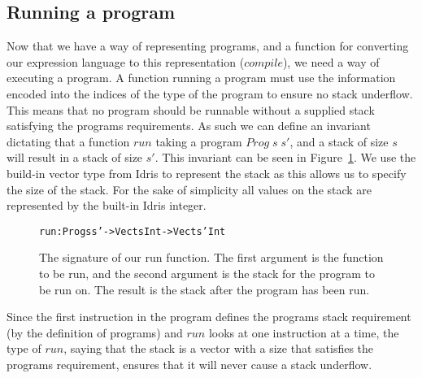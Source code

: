 \subsection{Running a program}
\label{sec:running_a_program}
Now that we have a way of representing programs, and a function for converting our expression language to this representation ($compile$), we need a way of executing a program. A function running a program must use the information encoded into the indices of the type of the program to ensure no stack underflow. This means that no program should be runnable without a supplied stack satisfying the programs requirements. As such we can define an invariant dictating that a function $run$ taking a program $Prog\;s\;s'$, and a stack of size $s$ will result in a stack of size $s'$. This invariant can be seen in Figure~\ref{fig:run_function}. We use the build-in vector type from Idris to represent the stack as this allows us to specify the size of the stack. For the sake of simplicity all values on the stack are represented by the built-in Idris integer. 

\begin{figure}
\begin{alltt}
run : Prog s s' -> Vect s Int -> Vect s' Int
\end{alltt}
\caption{The signature of our run function. The first argument is the function to be run, and the second argument is the stack for the program to be run on. The result is the stack after the program has been run.}
\label{fig:run_function}
\end{figure}

Since the first instruction in the program defines the programs stack requirement (by the definition of programs) and $run$ looks at one instruction at a time, the type of $run$, saying that the stack is a vector with a size that satisfies the programs requirement, ensures that it will never cause a stack underflow.
